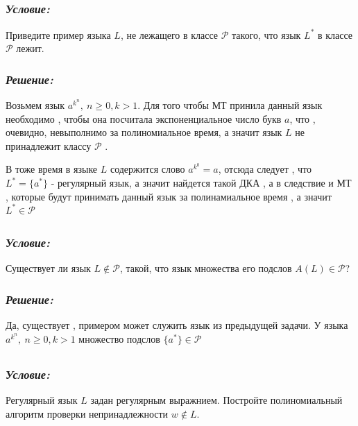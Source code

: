 \documentclass[a4paper, 11pt]{article} %
\newcommand*\circled[1]{\tikz[baseline=(char.base)]{
            \node[shape=circle,draw,inner sep=2pt] (char) {#1};}}
\begin{document}
\subsection*{\circled{2}} 
\subsubsection*{\textit{Условие:}}	
Приведите пример языка $L$, не лежащего в классе $\mathcal{P}$ такого, что язык $L^*$ в классе $\mathcal{P}$ лежит.
\subsubsection*{\textit{Решение:}}
Возьмем язык $a^{k^n}, \ n \geq 0 , k > 1 $. Для того чтобы МТ принила данный язык необходимо , чтобы она посчитала экспоненциальное число букв $a$, что , очевидно, невыполнимо за полиномиальное время, а значит язык $L$ не принадлежит классу $\mathcal{P}$ . 
\par 
В тоже время в языке $L$ содержится слово $a^{k^0} = a$, отсюда следует , что  $L^* = \{a^*\}$ - регулярный язык, а значит найдется такой  ДКА , а в следствие и МТ , которые будут принимать данный язык за полинамиальное время ,  а значит $ L^* \in \mathcal{P}$

\subsection*{\circled{3}} 
\subsubsection*{\textit{Условие:}}
Существует ли язык $L \notin \mathcal{P}$, такой, что язык множества его подслов $A(L) \in \mathcal{P}$?

\subsubsection*{\textit{Решение:}}
Да, существует , примером может служить язык из предыдущей задачи. У языка $a^{k^n}, \ n \geq 0 , k > 1 $ множество подслов $\{a^*\} \in \mathcal{P}$


\subsection*{\circled{4}} 
\subsubsection*{\textit{Условие:}}
Регулярный язык $L$ задан регулярным выражнием. Постройте полиномиальный алгоритм проверки непринадлежности $w \notin L$.
\end{document}
